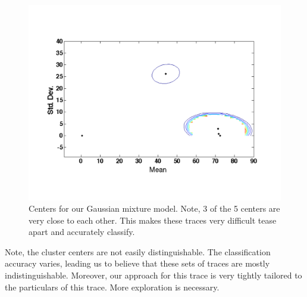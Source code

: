 \begin{figure}[t!] %
\centering
\includegraphics[width=0.8\columnwidth]{figs/gmm_centers}
\caption{Centers for our Gaussian mixture model.  Note, 3 of the 5 centers are very close to each other.  This makes these traces
very difficult tease apart and accurately classify.}
\label{fig:cluster_centers}
\end{figure}

Note, the cluster centers are not easily distinguishable.  The classification accuracy varies, leading us to believe that 
these sets of traces are mostly indistinguishable.  Moreover, our approach for this trace is very tightly tailored to
the particulars of this trace.  More exploration is necessary.


